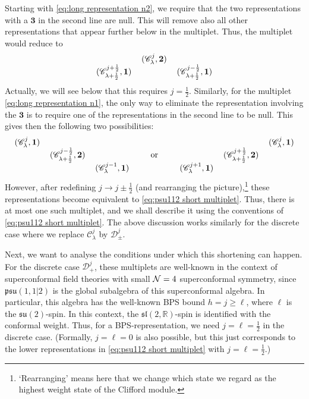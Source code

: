 \documentclass[12pt,a4paper]{article}
\newcommand{\be}{\begin{equation}}
\newcommand{\ee}{\end{equation}}
\begin{document}
Starting with \eqref{eq:long representation n2}, we require that the two representations with a $\mathbf{3}$ in the second line are null. This will remove also all other representations that appear further below in the multiplet. Thus, the multiplet would reduce to
\be 
\begin{tabular}{ccc}
& $(\mathscr{C}^{j}_\lambda,\mathbf{2})$ & \\
$(\mathscr{C}^{j+\frac{1}{2}}_{\lambda+\frac{1}{2}},\mathbf{1})$ & & $(\mathscr{C}^{j-\frac{1}{2}}_{\lambda+\frac{1}{2}},\mathbf{1})$
\end{tabular} \label{eq:psu112 short multiplet}
\ee
Actually, we will see below that this requires $j=\tfrac{1}{2}$.
Similarly, for the multiplet \eqref{eq:long representation n1}, the only way to eliminate the representation involving the $\mathbf{3}$ is to require one of the representations in the second line to be null. This gives then the following two possibilities:
\be 
\begin{tabular}{ccc}
$(\mathscr{C}^{j}_\lambda,\mathbf{1})$ & & \\
& $(\mathscr{C}^{j-\frac{1}{2}}_{\lambda+\frac{1}{2}},\mathbf{2})$ & \\
& & $(\mathscr{C}^{j-1}_\lambda,\mathbf{1})$
\end{tabular}
\qquad\text{or}\qquad
\begin{tabular}{ccc}
& & $(\mathscr{C}^{j}_\lambda,\mathbf{1})$ \\
& $(\mathscr{C}^{j+\frac{1}{2}}_{\lambda+\frac{1}{2}},\mathbf{2})$ & \\
$(\mathscr{C}^{j+1}_\lambda,\mathbf{1})$ & &
\end{tabular}
\ee
However, after redefining $j \to j \pm \tfrac{1}{2}$ (and rearranging the picture),\footnote{`Rearranging' means here that we change which state we regard as the highest weight state of the Clifford module.} these representations become equivalent to \eqref{eq:psu112 short multiplet}. Thus, there is at most one such multiplet, and we shall describe it using the conventions of \eqref{eq:psu112 short multiplet}. The above discussion works similarly for the discrete case where we replace $\mathscr{C}^j_\lambda$ by $\mathscr{D}^j_\pm$.

Next, we want to analyse the conditions under which this shortening can happen. For the discrete case
$\mathscr{D}^j_+$, these multiplets are well-known in the context of superconformal field theories with small ${\cal N}=4$ superconformal symmetry, since $\mathfrak{psu}(1,1|2)$ is the global subalgebra of this superconformal algebra.  In particular, this algebra has the well-known BPS bound $h=j \ge \ell$, where $\ell$ is the $\mathfrak{su}(2)$-spin. In this context, the $\mathfrak{sl}(2,\mathds{R})$-spin is identified with the conformal weight. Thus, for a BPS-representation, we need $j=\ell=\tfrac{1}{2}$ in the discrete case. (Formally, $j=\ell=0$ is also possible, but this just corresponds to the lower representations in  
\eqref{eq:psu112 short multiplet} with $j=\ell=\tfrac{1}{2}$.)
\end{document}
